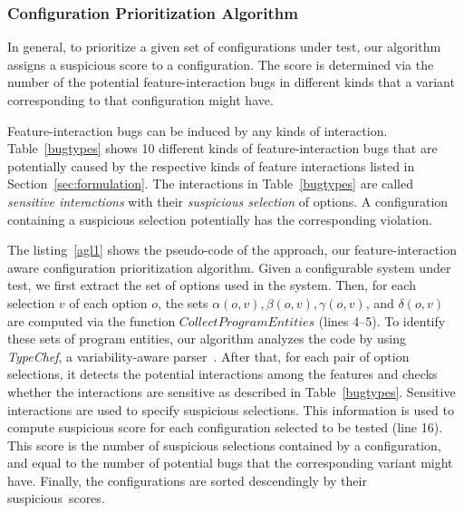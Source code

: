 


\subsubsection{Configuration Prioritization Algorithm}

In general, to prioritize a given set of configurations under test,
our algorithm assigns a suspicious score to a configuration. The
score is determined via the number of the potential
feature-interaction bugs in different kinds that a variant
corresponding to that configuration might have.



Feature-interaction bugs can be induced by any kinds of
interaction. Table~\ref{bugtypes} shows 10 different kinds of
feature-interaction bugs that are potentially caused by the respective
kinds of feature interactions listed in
Section~\ref{sec:formulation}. The interactions in
Table~\ref{bugtypes} are called \textit{sensitive interactions} with
their \textit{suspicious selection} of options.
A configuration containing a suspicious selection potentially has the
corresponding violation.

The listing~\ref{agl1} shows the pseudo-code of the approach, our
feature-interaction aware configuration prioritization
algorithm. Given a configurable system under test, we first extract
the set of options used in the system. Then, for each selection $v$ of
each option $o$, the sets $\alpha(o, v), \beta(o, v), \gamma(o,v)$,
and $\delta(o,v)$ are computed via the function
$CollectProgramEntities$ (lines 4--5). To identify these sets of
program entities, our algorithm analyzes the code by using
\textit{TypeChef}, a variability-aware
parser~\cite{Kenner:2010:TTT:1868688.1868693}. After that, for each
pair of option selections, it detects the potential interactions among
the features and checks whether the interactions are sensitive as
described in Table~\ref{bugtypes}.
%
Sensitive interactions are used to specify suspicious selections. This
information is used to compute suspicious score for each configuration
selected to be tested (line 16). This score is the number of
suspicious selections contained by a configuration, and equal to the
number of potential bugs that  the corresponding variant might
have. Finally, the configurations are sorted descendingly by
their suspicious~scores.